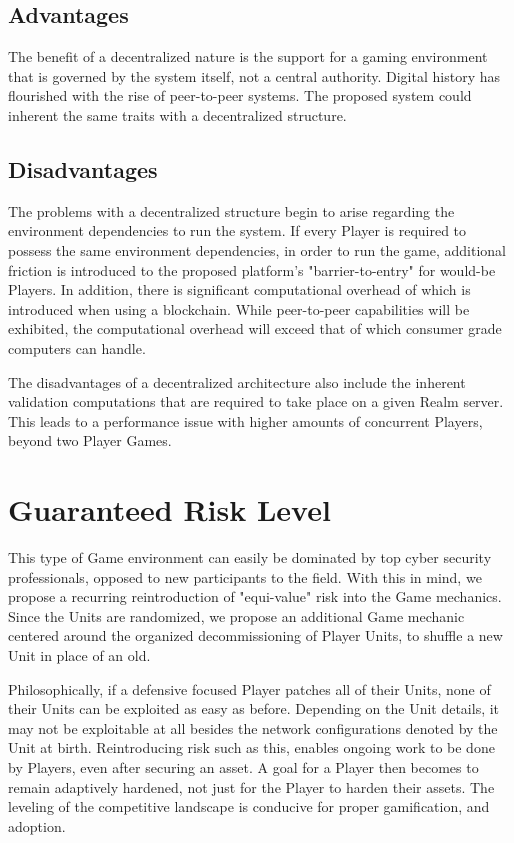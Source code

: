\documentclass[10pt, titlepage, twocolumn]{article}
\newcommand{\ii}{\indent\indent}
\begin{document}
\subsection{Advantages}
\ii
\indent The benefit of a decentralized nature is the support for a gaming environment that is governed by the system itself, not a central authority. Digital history has flourished with the rise of peer-to-peer systems. The proposed system could inherent the same traits with a decentralized structure.

\subsection{Disadvantages}
\ii
The problems with a decentralized structure begin to arise regarding the environment dependencies to run the system. If every Player is required to possess the same environment dependencies, in order to run the game, additional friction is introduced to the proposed platform's "barrier-to-entry" for would-be Players. In addition, there is significant computational overhead of which is introduced when using a blockchain. While peer-to-peer capabilities will be exhibited, the computational overhead will exceed that of which consumer grade computers can handle.

The disadvantages of a decentralized architecture also include the inherent validation computations that are required to take place on a given Realm server. This leads to a performance issue with higher amounts of concurrent Players, beyond two Player Games.


\section{Guaranteed Risk Level}
This type of Game environment can easily be dominated by top cyber security professionals, opposed to new participants to the field. With this in mind, we propose a recurring reintroduction of "equi-value" risk into the Game mechanics. Since the Units are randomized, we propose an additional Game mechanic centered around the organized decommissioning of Player Units, to shuffle a new Unit in place of an old. 

Philosophically, if a defensive focused Player patches all of their Units, none of their Units can be exploited as easy as before. Depending on the Unit details, it may not be exploitable at all besides the network configurations denoted by the Unit at birth. Reintroducing risk such as this, enables ongoing work to be done by Players, even after securing an asset. A goal for a Player then becomes to remain adaptively hardened, not just for the Player to harden their assets. The leveling of the competitive landscape is conducive for proper gamification, and adoption.
\end{document}
